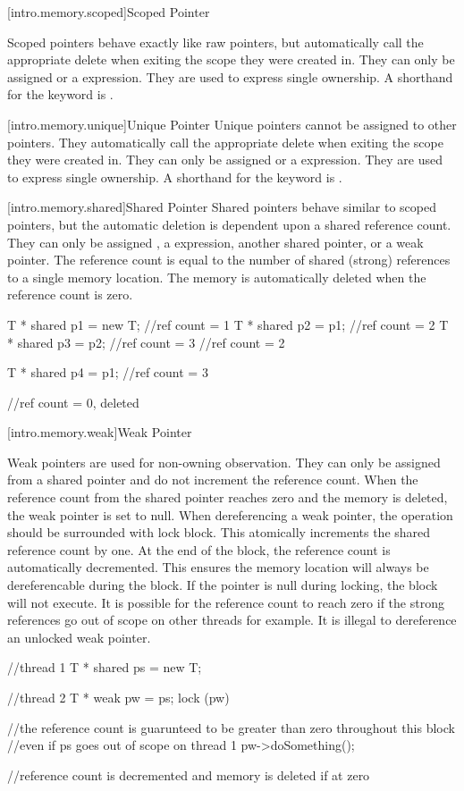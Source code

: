 [intro.memory.scoped]{Scoped Pointer}

Scoped pointers behave exactly like raw pointers, but automatically call the appropriate delete when exiting the scope they were created in. They can only be assigned  or a  expression. They are used to express single ownership. A shorthand for the  keyword is \tcode{!}.

[intro.memory.unique]{Unique Pointer}
Unique pointers cannot be assigned to other pointers. They automatically call the appropriate delete when exiting the scope they were created in. They can only be assigned  or a  expression. They are used to express single ownership. A shorthand for the  keyword is \tcode{\^}.

[intro.memory.shared]{Shared Pointer}
Shared pointers behave similar to scoped pointers, but the automatic deletion is dependent upon a shared reference count. They can only be assigned , a  expression, another shared pointer, or a weak pointer. The reference count is equal to the number of shared (strong) references to a single memory location. The memory is automatically deleted when the reference count is zero.

\begin{codeblock}

{
	T * shared p1 = new T;	//ref count = 1
	T * shared p2 = p1;		//ref count = 2
	{
		T * shared p3 = p2;	//ref count = 3
	} //ref count = 2

	T * shared p4 = p1;	//ref count = 3
} //ref count = 0, deleted

\end{codeblock}

[intro.memory.weak]{Weak Pointer}

Weak pointers are used for non-owning observation. They can only be assigned from a shared pointer and do not increment the reference count. When the reference count from the shared pointer reaches zero and the memory is deleted, the weak pointer is set to null. When dereferencing a weak pointer, the operation should be surrounded with lock block. This atomically increments the shared reference count by one. At the end of the block, the reference count is automatically decremented. This ensures the memory location will always be dereferencable during the block. If the pointer is null during locking, the block will not execute. It is possible for the reference count to reach zero if the strong references go out of scope on other threads for example. It is illegal to dereference an unlocked weak pointer.

\begin{codeblock}

//thread 1
T * shared ps = new T;


//thread 2
T * weak pw = ps;
lock (pw)	
{
	//the reference count is guarunteed to be greater than zero throughout this block
	//even if ps goes out of scope on thread 1
	pw->doSomething();
	
} //reference count is decremented and memory is deleted if at zero


\end{codeblock}